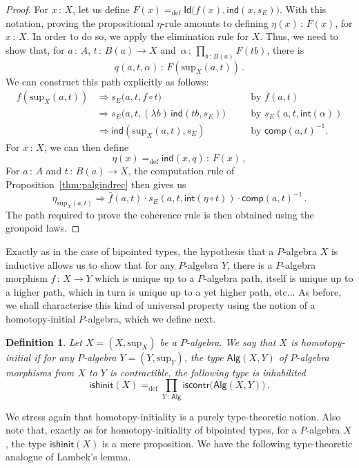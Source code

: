 \documentclass[10pt,a4paper,oneside,reqno]{amsart}
\theoremstyle{mythm}
\theoremstyle{mydef}
\newtheorem{definition}[theorem]{Definition}
\theoremstyle{myrmk}
\newcommand{\ie}{\text{i.e.\ }}
\newcommand{\by}[1]{\quad&&\text{by {$#1$}}}
\newcommand{\defeq}{=_{\mathrm{def}}}
\newcommand{\co}{\,{:}\,}
\newcommand{\iscontr}{\mathsf{iscontr}}
\newcommand{\isalghinit}{\mathsf{ishinit}}
\renewcommand{\int}{\mathsf{int}}
\newcommand{\Id}{\mathsf{Id}}
\newcommand{\ind}{\mathsf{ind}}
\newcommand{\comp}{\mathsf{comp}}
\newcommand{\Palg}{\mathsf{Alg}}
\renewcommand{\sup}{\mathrm{sup}}
\begin{document}
\begin{proof} For $x \co X$, let us define $F(x) \defeq \Id \big(   f(x), \ind(x,s_E))$. With this notation, proving
 the propositional $\eta$-rule amounts to defining $\eta(x) \co F(x)$, for $x \co X$. In order to do so, we apply
the elimination rule for $X$. Thus, we need to show that, for $a \co A$, $t \co B(a) \to X$ and~$\alpha \co \prod_{b \co B(a)} F(tb)$, there 
is 
\[
q(a,t,\alpha) \co   F(\sup_X(a,t)) \, .
\]
We can construct this path explicitly as follows:
\begin{align*}
f(\sup_X(a,t)) &\Rightarrow s_E\big(a,t, f \circ t  \big)   \by{\bar{f}(a,t)}\\
	&\Rightarrow s_E\big(a,t, (\lambda b)\, \ind(t b,s_E) \big) \by{s_E(a,t,\int(\alpha))}\\
	& \Rightarrow \ind(\sup_X(a,t),s_E) \by{\comp(a,t)^{-1}}.
\end{align*}
For $x \co X$, we can then define
\[
\eta(x) \defeq \ind(x,q) \co F(x) \, ,
\] 
For $a \co A$ and $t \co B(a) \to X$, the  computation rule of Proposition~\ref{thm:palgindrec} then gives us
\[
 \eta_{\sup_X(a,t)} \Rightarrow  \bar{f}(a,t) \cdot s_E(a,t,\int(  \eta \circ t ))  \cdot  \comp(a,t)^{-1} \, .
\]
The path required to prove  the coherence rule is then obtained using the groupoid laws.
\end{proof}

Exactly as in the case of bipointed types, the hypothesis that a $P$-algebra $X$ is inductive allows us to show that for any
$P$-algebra $Y$, there is a $P$-algebra morphism $f \co X \to Y$ which is unique up to a $P$-algebra path, itself is unique up 
to a higher path, which in turn is unique up to a yet higher path, etc... As before, we shall characterise this kind of universal property
using the notion of a homotopy-initial $P$-algebra, which we define next.

\begin{definition}\label{def:AlgInit}
Let $X = (X, \sup_X)$ be a $P$-algebra. We say that $X$ is  \emph{homotopy-initial}  if for any $P$-algebra 
$Y = (Y, \sup_Y)$, the type $\Palg(X,Y)$ of $P$-algebra morphisms from $X$ to $Y$
is contractible, \ie the following type is inhabilited
\[
\isalghinit(X) \defeq
 \prod_{Y \co \Palg}  \iscontr \big( \Palg(X,Y) \big)  \, .
\]  
\end{definition}

We stress again that homotopy-initiality is a purely type-theoretic notion. Also note that, exactly as for 
homotopy-initiality of bipointed types, for a $P$-algebra $X$, the type
$\isalghinit(X)$ is a mere proposition. 
We have the following type-theoretic analogue of Lambek's lemma.
\end{document}
